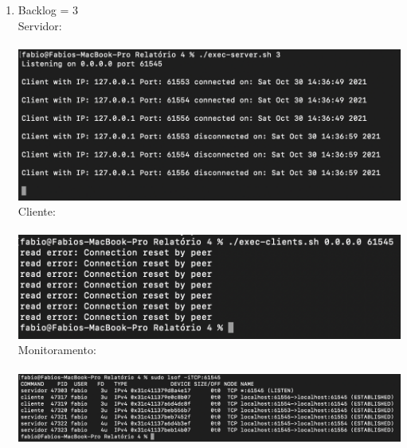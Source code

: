 \documentclass[12pt,a4paper]{report}
\begin{document}
\begin{enumerate}
\begin{enumerate}
        \item Backlog = 3\\
        Servidor:\\\\
        \includegraphics[width=1\textwidth]{images/servidor-backlog-3.png}
        Cliente:\\\\
        \includegraphics[width=1\textwidth]{images/cliente-backlog-3.png}
        Monitoramento:\\\\
        \includegraphics[width=1\textwidth]{images/lsof-backlog-3.png}
        

\end{enumerate}
\end{enumerate}
\end{document}
